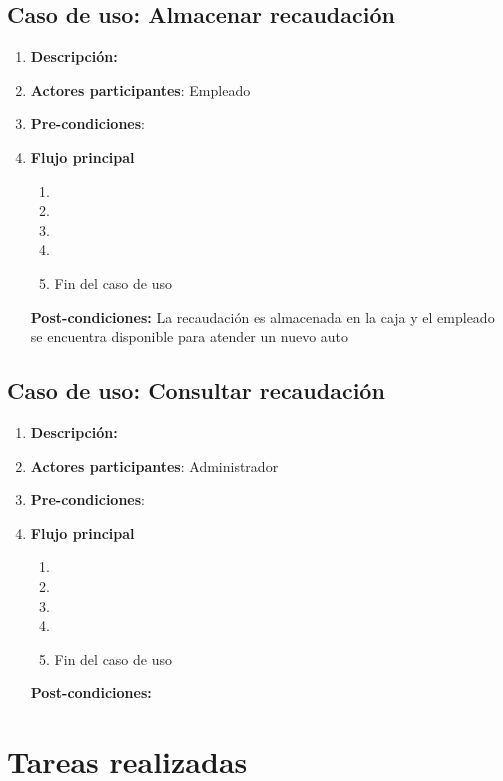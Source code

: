 \documentclass[12pt,a4paper,titlepage,oneside]{article}
\begin{document}
\subsection{Caso de uso: Almacenar recaudación}

\begin{enumerate}
\item \textbf{Descripción:} 
\item \textbf{Actores participantes}: Empleado
\item \textbf{Pre-condiciones}: 
\item \textbf{Flujo principal}
\begin{enumerate}
\item 
\item 
\item 
\item 
\item Fin del caso de uso
\end{enumerate}
\textbf{Post-condiciones:} La recaudación es almacenada en la caja y el empleado se encuentra disponible para atender un nuevo auto
\end{enumerate}

\subsection{Caso de uso: Consultar recaudación}

\begin{enumerate}
\item \textbf{Descripción:} 
\item \textbf{Actores participantes}: Administrador
\item \textbf{Pre-condiciones}: 
\item \textbf{Flujo principal}
\begin{enumerate}
\item 
\item 
\item 
\item 
\item Fin del caso de uso
\end{enumerate}
\textbf{Post-condiciones:} 
\end{enumerate}

\section{Tareas realizadas}
\end{document}
